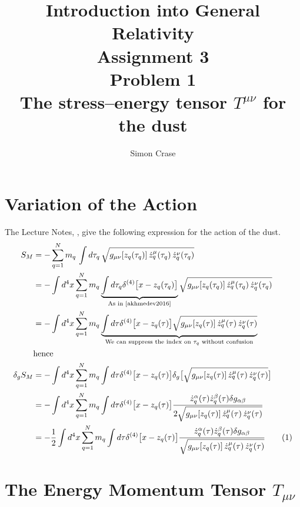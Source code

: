 \documentclass[]{article}
\title{Introduction into General Relativity\\Assignment 3\\Problem 1\\The stress--energy tensor $T^{\mu\nu}$ for the dust}
\author{Simon Crase}
\newcommand\numberthis{\addtocounter{equation}{1}\tag{\theequation}}
\begin{document}
\maketitle
\thispagestyle{fancy}


\section{Variation of the Action}

The Lecture Notes, \cite[(90)]{akhmedev2016}, give the following expression for the action of the dust.
\begin{align*}
S_M &= - \sum_{q=1}^N m_q \, \int d\tau_q \, \sqrt{g_{\mu\nu}[z_q(\tau_q)] \, \dot{z}_q^\mu(\tau_q)\, \dot{z}_q^\nu(\tau_q)}\\
&= - \int d^4 x \sum_{q=1}^N m_q \underbrace{\int d \tau_q \delta^{(4)} \big[x - z_q(\tau_q)\big]}_\text{As in \cite[(72)]{akhmedev2016}} \sqrt{g_{\mu\nu}[z_q(\tau_q)] \, \dot{z}_q^\mu(\tau_q)\, \dot{z}_q^\nu(\tau_q)} \\
&= - \int d^4 x \sum_{q=1}^N m_q \underbrace{\int d \tau \delta^{(4)} \big[x - z_q(\tau)\big] \sqrt{g_{\mu\nu}[z_q(\tau)] \, \dot{z}_q^\mu(\tau)\, \dot{z}_q^\nu(\tau)}}_\text{We can suppress the index on $\tau_q$ without confusion} \\
&\text{hence}\\
\delta_{g} S_M &= - \int d^4 x \sum_{q=1}^N m_q \int d \tau \delta^{(4)} \big[x - z_q(\tau)\big] \delta_{g} \big[\sqrt{g_{\mu\nu}[z_q(\tau)] \, \dot{z}_q^\mu(\tau)\, \dot{z}_q^\nu(\tau)}\big] \\
&= - \int d^4 x \sum_{q=1}^N m_q \int d \tau \delta^{(4)} \big[x - z_q(\tau)\big] \frac{ \dot{z}_q^\alpha(\tau) \dot{z}_q^\beta(\tau) \delta g_{\alpha\beta}}{2 \sqrt{g_{\mu\nu}[z_q(\tau)] \, \dot{z}_q^\mu(\tau)\, \dot{z}_q^\nu(\tau)}} \\
&= - \frac{1}{2} \int d^4 x \sum_{q=1}^N m_q \int d \tau \delta^{(4)} \big[x - z_q(\tau)\big] \frac{ \dot{z}_q^\alpha(\tau) \dot{z}_q^\beta(\tau) \delta g_{\alpha\beta}}{ \sqrt{g_{\mu\nu}[z_q(\tau)] \, \dot{z}_q^\mu(\tau)\, \dot{z}_q^\nu(\tau)}} \numberthis \label{eq:variation_of_action}
\end{align*}





\section{The Energy Momentum Tensor $T_{\mu\nu}$}
\end{document}
